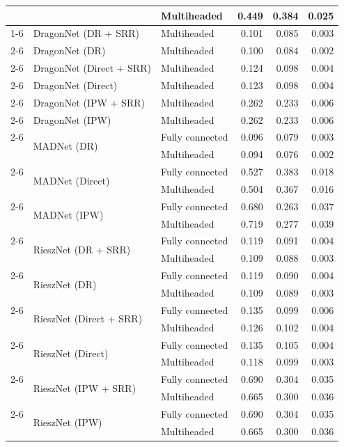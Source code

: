 \begin{table}[hbt!]
{\begin{tabular}{lllrrr}
     &  & Multiheaded & 0.449 & 0.384 & 0.025 \\
    \cmidrule(lr){1-6}
    \multirow[t]{24}{*}{IHDP} & DragonNet (DR + SRR) & Multiheaded & 0.101 & 0.085 & 0.003 \\
    \cmidrule(lr){2-6}
     & DragonNet (DR) & Multiheaded & 0.100 & 0.084 & 0.002 \\
    \cmidrule(lr){2-6}
     & DragonNet (Direct + SRR) & Multiheaded & 0.124 & 0.098 & 0.004 \\
    \cmidrule(lr){2-6}
     & DragonNet (Direct) & Multiheaded & 0.123 & 0.098 & 0.004 \\
    \cmidrule(lr){2-6}
     & DragonNet (IPW + SRR) & Multiheaded & 0.262 & 0.233 & 0.006 \\
    \cmidrule(lr){2-6}
     & DragonNet (IPW) & Multiheaded & 0.262 & 0.233 & 0.006 \\
    \cmidrule(lr){2-6}
     & \multirow[t]{2}{*}{MADNet (DR)} & Fully connected & 0.096 & 0.079 & 0.003 \\
     &  & Multiheaded & 0.094 & 0.076 & 0.002 \\
    \cmidrule(lr){2-6}
     & \multirow[t]{2}{*}{MADNet (Direct)} & Fully connected & 0.527 & 0.383 & 0.018 \\
     &  & Multiheaded & 0.504 & 0.367 & 0.016 \\
    \cmidrule(lr){2-6}
     & \multirow[t]{2}{*}{MADNet (IPW)} & Fully connected & 0.680 & 0.263 & 0.037 \\
     &  & Multiheaded & 0.719 & 0.277 & 0.039 \\
    \cmidrule(lr){2-6}
     & \multirow[t]{2}{*}{RieszNet (DR + SRR)} & Fully connected & 0.119 & 0.091 & 0.004 \\
     &  & Multiheaded & 0.109 & 0.088 & 0.003 \\
    \cmidrule(lr){2-6}
     & \multirow[t]{2}{*}{RieszNet (DR)} & Fully connected & 0.119 & 0.090 & 0.004 \\
     &  & Multiheaded & 0.109 & 0.089 & 0.003 \\
    \cmidrule(lr){2-6}
     & \multirow[t]{2}{*}{RieszNet (Direct + SRR)} & Fully connected & 0.135 & 0.099 & 0.006 \\
     &  & Multiheaded & 0.126 & 0.102 & 0.004 \\
    \cmidrule(lr){2-6}
     & \multirow[t]{2}{*}{RieszNet (Direct)} & Fully connected & 0.135 & 0.105 & 0.004 \\
     &  & Multiheaded & 0.118 & 0.099 & 0.003 \\
    \cmidrule(lr){2-6}
     & \multirow[t]{2}{*}{RieszNet (IPW + SRR)} & Fully connected & 0.690 & 0.304 & 0.035 \\
     &  & Multiheaded & 0.665 & 0.300 & 0.036 \\
    \cmidrule(lr){2-6}
     & \multirow[t]{2}{*}{RieszNet (IPW)} & Fully connected & 0.690 & 0.304 & 0.035 \\
     &  & Multiheaded & 0.665 & 0.300 & 0.036 \\
    \bottomrule
    \end{tabular}
    }
    \label{tab:repro-results}
\end{table}

